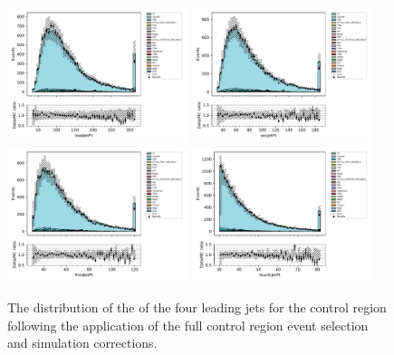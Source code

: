 \begin{figure}[tbp]
\centering
\includegraphics[width=0.47\textwidth]{figs/tzq-fullSelection-plots/plots_emu/leadJetPt.pdf}
\includegraphics[width=0.47\textwidth]{figs/tzq-fullSelection-plots/plots_emu/secJetPt.pdf}
\\
\includegraphics[width=0.47\textwidth]{figs/tzq-fullSelection-plots/plots_emu/thirdJetPt.pdf}
\includegraphics[width=0.47\textwidth]{figs/tzq-fullSelection-plots/plots_emu/fourthJetPt.pdf}
\caption{
The distribution of the \pt of the four leading jets for the \ttbar control region following the application of the full control region event selection and simulation corrections.
}
\label{fig:ttbarCR_jetPt}
\end{figure}

